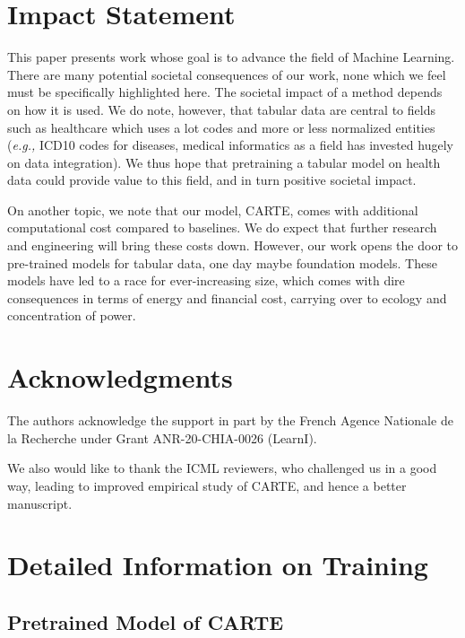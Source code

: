 \documentclass{article}
\theoremstyle{plain}
\theoremstyle{definition}
\theoremstyle{remark}
\begin{document}
\section*{Impact Statement}

This paper presents work whose goal is to advance the field of Machine Learning. There are many potential societal consequences of our work, none which we feel must be specifically highlighted here. The societal impact of a method depends on how it is used. We do note, however, that tabular data are central to fields such as healthcare which uses a lot codes and more or less normalized entities (\emph{e.g.,} ICD10 codes for diseases, medical informatics as a field has invested hugely on data integration). We thus hope that pretraining a tabular model on health data could provide value to this field, and in turn positive societal impact.

On another topic, we note that our model, CARTE, comes with additional computational cost compared to baselines. We do expect that further research and engineering will bring these costs down. However, our work opens the door to pre-trained models for tabular data, one day maybe foundation models. These models have led to a race for ever-increasing size, which comes with dire consequences in terms of energy and financial cost, carrying over to ecology and concentration of power.

\section*{Acknowledgments}
The authors acknowledge the support in part by the French Agence Nationale de la Recherche under Grant ANR-20-CHIA-0026 (LearnI).

We also would like to thank the ICML reviewers, who challenged us in a good way, leading to improved empirical study of CARTE, and hence a better manuscript.





\appendix
\onecolumn

\section{Detailed Information on Training}

\subsection{Pretrained Model of CARTE}\label{app:pretrain}
\end{document}
